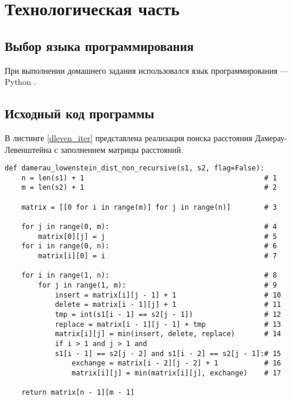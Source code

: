 \chapter{Технологическая часть}

\section{Выбор языка программирования}
При выполнении домашнего задания использовался язык программирования --- Python \cite{PythonBook}.

\section{Исходный код программы}
В листинге \ref{dleven_iter} представлена реализация поиска расстояния Дамерау-Левенштейна с заполнением матрицы расстояний.

\begin{lstlisting}[caption=Реализация итеративного алгоритма поиска расстояния Дамерау-Левенштейна с заполнением матрицы расстояний,
    label={dleven_iter}]
def damerau_lowenstein_dist_non_recursive(s1, s2, flag=False):
    n = len(s1) + 1                                           # 1
    m = len(s2) + 1                                           # 2

    matrix = [[0 for i in range(m)] for j in range(n)]        # 3

    for j in range(0, m):                                     # 4
        matrix[0][j] = j                                      # 5
    for i in range(0, n):                                     # 6
        matrix[i][0] = i                                      # 7

    for i in range(1, n):                                     # 8
        for j in range(1, m):                                 # 9
            insert = matrix[i][j - 1] + 1                     # 10
            delete = matrix[i - 1][j] + 1                     # 11
            tmp = int(s1[i - 1] == s2[j - 1])                 # 12
            replace = matrix[i - 1][j - 1] + tmp              # 13
            matrix[i][j] = min(insert, delete, replace)       # 14
            if i > 1 and j > 1 and 
            s1[i - 1] == s2[j - 2] and s1[i - 2] == s2[j - 1]:# 15
                exchange = matrix[i - 2][j - 2] + 1           # 16
                matrix[i][j] = min(matrix[i][j], exchange)    # 17

    return matrix[n - 1][m - 1]
\end{lstlisting}

